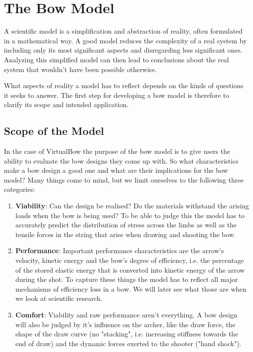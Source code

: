 
\chapter{The Bow Model}

A scientific model is a simplification and abstraction of reality, often formulated in a mathematical way.
A good model reduces the complexity of a real system by including only its most significant aspects and disregarding less significant ones.
Analyzing this simplified model can then lead to conclusions about the real system that wouldn't have been possible otherwise.

What aspects of reality a model has to reflect depends on the kinds of questions it seeks to answer.
The first step for developing a bow model is therefore to clarify its scope and intended application.

\section{Scope of the Model}
\label{section:model-scope}

In the case of VirtualBow the purpose of the bow model is to give users the ability to evaluate the bow designs they come up with.
So what characteristics make a bow design a good one and what are their implications for the bow model?
Many things come to mind, but we limit ourselves to the following three categories:

\begin{enumerate}
\item \textbf{Viability}: Can the design be realised? Do the materials withstand the arising loads when the bow is being used?
To be able to judge this the model has to accurately predict the distribution of stress across the limbs as well as the tensile forces in the string that arise when drawing and shooting the bow.

\item \textbf{Performance}: Important performance characteristics are the arrow's velocity, kinetic energy and the bow's degree of efficiency, i.e. the percentage of the stored elastic energy that is converted into kinetic energy of the arrow during the shot.
To capture these things the model has to reflect all major mechanisms of efficiency loss in a bow.
We will later see what those are when we look at scientific research.

\item \textbf{Comfort}: Viability and raw performance aren't everything.
A bow design will also be judged by it's influence on the archer, like the draw force, the shape of the draw curve (no "stacking", i.e. increasing stiffness towards the end of draw) and the dynamic forces exerted to the shooter ("hand shock").
\end{enumerate}

